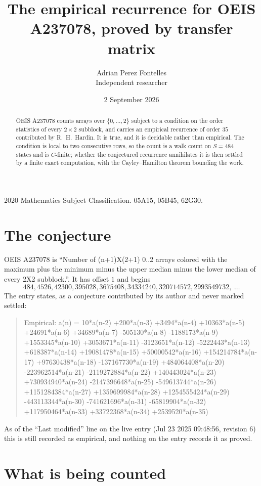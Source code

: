 \documentclass[11pt,a4paper]{article}
\title{The empirical recurrence for OEIS A237078, proved by transfer matrix}
\author{Adrian Perez Fontelles\\ \small Independent researcher}
\date{2 September 2026}
\theoremstyle{plain}
\theoremstyle{definition}
\begin{document}
\maketitle

\begin{abstract}
OEIS A237078 counts arrays over $\{0,\dots,2\}$ subject to a condition on the order
statistics of every $2\times2$ subblock, and carries an empirical recurrence of order
$35$ contributed by R.~H.~Hardin. It is true, and it is decidable rather than empirical.
The condition is local to two consecutive rows, so the count is a walk count on $S=484$
states and is $C$-finite; whether the conjectured recurrence annihilates it is then settled by
a finite exact computation, with the Cayley--Hamilton theorem bounding the work.
\end{abstract}

\noindent\small 2020 Mathematics Subject Classification. 05A15, 05B45, 62G30.\normalsize

\section{The conjecture}

OEIS A237078 is ``Number of (n+1)X(2+1) 0..2 arrays colored with the maximum plus the minimum minus the upper median minus the lower median of every 2X2 subblock.''. It has offset $1$ and begins
\[
484, 4526, 42300, 395028, 3675408, 34334240, 320714572, 2993549732,\ \dots
\]
The entry states, as a conjecture contributed by its author and never marked settled:
\begin{quote}
Empirical: a(n) = 10*a(n-2) +200*a(n-3) +3494*a(n-4) +10363*a(n-5) +24691*a(n-6) +34689*a(n-7) -505130*a(n-8) -1188173*a(n-9) +1553345*a(n-10) +3053671*a(n-11) -3123651*a(n-12) -5222443*a(n-13) +618387*a(n-14) +19081478*a(n-15) +50000542*a(n-16) +154214784*a(n-17) +97630438*a(n-18) -137167730*a(n-19) +484064408*a(n-20) -223962514*a(n-21) -2119272884*a(n-22) +140443024*a(n-23) +730934940*a(n-24) -2147396648*a(n-25) -549613744*a(n-26) +1151284384*a(n-27) +1359699984*a(n-28) +1254555424*a(n-29) -443113344*a(n-30) -741621696*a(n-31) -65819904*a(n-32) +117950464*a(n-33) +33722368*a(n-34) +2539520*a(n-35)
\end{quote}
As of the ``Last modified'' line on the live entry (Jul 23 2025 09:48:56, revision 6) this is still
recorded as empirical, and nothing on the entry records it as proved.

\section{What is being counted}
\end{document}
